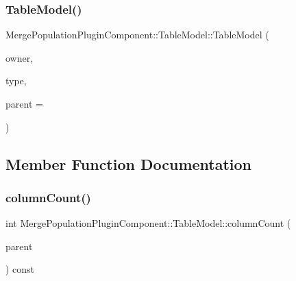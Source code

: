 \subsubsection{\texorpdfstring{TableModel()}{TableModel()}}
{\footnotesize\ttfamily Merge\+Population\+Plugin\+Component\+::\+Table\+Model\+::\+Table\+Model (\begin{DoxyParamCaption}\item[{\mbox{\hyperlink{class_merge_population_plugin_component}{Merge\+Population\+Plugin\+Component}} $\ast$}]{owner,  }\item[{\mbox{\hyperlink{class_merge_population_plugin_component_1_1_table_model_aedcae9b9dcacd928610323861dcb1258}{Type}}}]{type,  }\item[{Q\+Object $\ast$}]{parent = {} }\end{DoxyParamCaption})}



\subsection{Member Function Documentation}
\mbox{\label{class_merge_population_plugin_component_1_1_table_model_a0b54558494c9992d90e0f5178a632a88}} 
\subsubsection{\texorpdfstring{columnCount()}{columnCount()}}
{\footnotesize\ttfamily int Merge\+Population\+Plugin\+Component\+::\+Table\+Model\+::column\+Count (\begin{DoxyParamCaption}\item[{const Q\+Model\+Index \&}]{parent }\end{DoxyParamCaption}) const}

\mbox{\label{class_merge_population_plugin_component_1_1_table_model_a6e33ec16c60aa70c6a43a93d79cff618}} 

